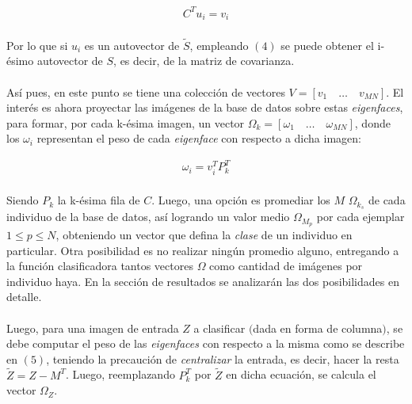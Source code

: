 \documentclass[12pt, twocolumn]{article}
\begin{document}
	\begin{align}
		C^{T}u_{i} = v_{i}
	\end{align}
	
	\paragraph{} Por lo que si $u_{i}$ es un autovector de $\widetilde{S}$, empleando $(4)$ se puede obtener el i-ésimo autovector de $S$, es decir, de la matriz de covarianza. 
	
	\paragraph{} Así pues, en este punto se tiene una colección de vectores $V = \left[v_{1}\quad\dots\quad v_{MN}\right]$. El interés es ahora proyectar las imágenes de la base de datos sobre estas \textit{eigenfaces}, para formar, por cada k-ésima imagen, un vector $\Omega_{k} = \left[\omega_{1}\quad\dots\quad\omega_{MN}\right]$, donde los $\omega_{i}$ representan el peso de cada \textit{eigenface} con respecto a dicha imagen:
	
	\begin{align}
		\omega_{i} = v_{i}^{T}P_{k}^{T}
	\end{align}
	
	\paragraph{} Siendo $P_{k}$ la k-ésima fila de $C$. Luego, una opción es promediar los $M$ $\Omega_{k_{s}}$ de cada individuo de la base de datos, así logrando un valor medio $\Omega_{M_{p}}$ por cada ejemplar $1 \le p \le N$, obteniendo un vector que defina la \textit{clase} de un individuo en particular. Otra posibilidad es no realizar ningún promedio alguno, entregando a la función clasificadora tantos vectores $\Omega$ como cantidad de imágenes por individuo haya. En la sección de resultados se analizarán las dos posibilidades en detalle.  
	
	\paragraph{} Luego, para una imagen de entrada $Z$ a clasificar $($dada en forma de columna$)$, se debe computar el peso de las \textit{eigenfaces} con respecto a la misma como se describe en $(5)$, teniendo la precaución de \textit{centralizar} la entrada, es decir, hacer la resta $\widetilde{Z} = Z - M^{T}$. Luego, reemplazando $P_{k}^{T}$ por $\widetilde{Z}$ en dicha ecuación, se calcula el vector $\Omega_{Z}$.
	
\end{document}
